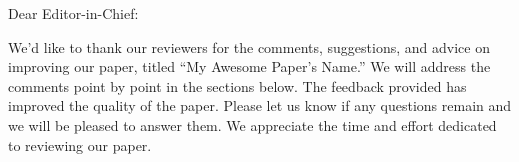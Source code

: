 \documentclass[preprint,12pt]{elsarticle}
\begin{document}
% 

\noindent
Dear Editor-in-Chief:

\vspace{6pt}
\noindent
We'd like to thank our reviewers for the comments, suggestions, and advice on
improving our paper, titled ``My Awesome Paper's Name.''
We will address the comments point by point in the sections below.
The feedback provided has improved the quality of the paper.
Please let us know if any questions remain and we will be pleased to answer
them.
We appreciate the time and effort dedicated to reviewing our paper. 

\vspace{4ex}


\newpage
{}

\end{document}
